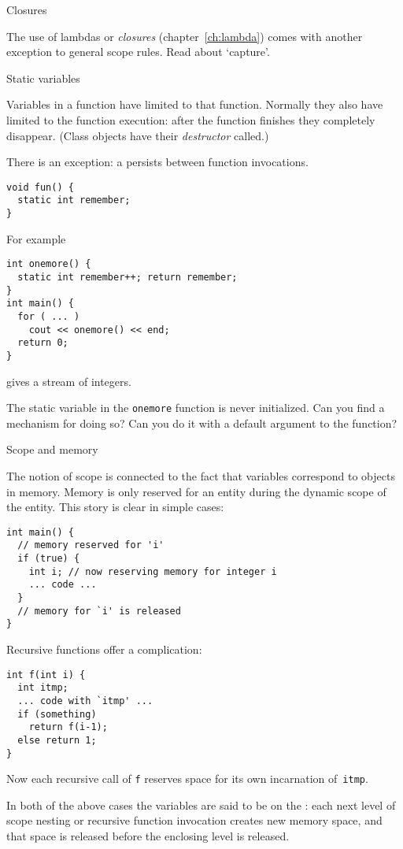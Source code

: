  {Closures}

The use of 
%
lambdas
or
%
\emph{closures} (chapter~\ref{ch:lambda}) comes with
another exception to general scope rules. Read about `capture'.

 {Static variables}
\label{sec:static-scope}

Variables in a function have  limited to
that function. Normally they also have 
limited to the function execution: after the function finishes they
completely disappear. (Class objects have their
%
\emph{destructor}
called.)

There is an exception: a  persists
between function invocations.
\begin{lstlisting}
void fun() {
  static int remember;
}
\end{lstlisting}
For example
\begin{lstlisting}
int onemore() {
  static int remember++; return remember;
}
int main() {
  for ( ... )
    cout << onemore() << end;
  return 0;
}
\end{lstlisting}
gives a stream of integers.
\begin{exercise}
  The static variable in the \lstinline{onemore} function is never
  initialized. Can you find a mechanism for doing so?
  Can you do it with a default argument to the function?
\end{exercise}

 {Scope and memory}

The notion of scope is connected to the fact that variables correspond
to objects in memory. Memory is only reserved for an entity during the
dynamic scope of the entity. This story is clear in simple cases:
\begin{lstlisting}
int main() {
  // memory reserved for 'i'
  if (true) {
    int i; // now reserving memory for integer i
    ... code ...
  }
  // memory for `i' is released
}
\end{lstlisting}
Recursive functions offer a complication:
\begin{lstlisting}
int f(int i) {
  int itmp;
  ... code with `itmp' ...
  if (something)
    return f(i-1);
  else return 1;
}
\end{lstlisting}
Now each recursive call of \lstinline{f} reserves space for its own
incarnation of~\lstinline{itmp}.

In both of the above cases the variables are said to be on the
: each next level of scope nesting or recursive
function invocation creates new memory space, and that space is
released before the enclosing level is released.

